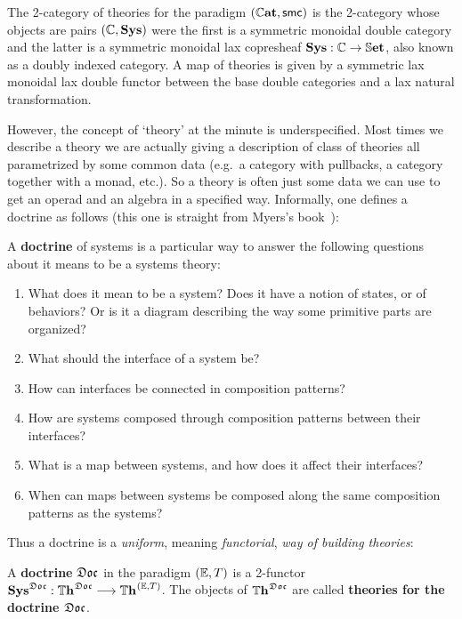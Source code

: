 \begin{example}
	The 2-category of theories for the paradigm $(\dblCat, \SymDblOperads)$ is the 2-category whose objects are pairs $(\compth{C}, \Sys)$ were the first is a symmetric monoidal double category and the latter is a symmetric monoidal lax copresheaf $\Sys:\compth{C} \to \dblSet$, also known as a doubly indexed category.
	A map of theories is given by a symmetric lax monoidal lax double functor between the base double categories and a lax natural transformation.
\end{example}

However, the concept of `theory' at the minute is underspecified.
Most times we describe a theory we are actually giving a description of class of theories all parametrized by some common data (e.g.~a category with pullbacks, a category together with a monad, etc.).
So a theory is often just some data we can use to get an operad and an algebra in a specified way.
Informally, one defines a doctrine as follows (this one is straight from Myers's book~\cite{myers_categorical_2022}):

\begin{informaldefinition}[Doctrine]
	A \textbf{doctrine} of systems is a particular way to answer the following questions about it means to be a systems theory:
	\begin{enumerate}
		\item What does it mean to be a system? Does it have a notion of states, or of behaviors?
		Or is it a diagram describing the way some primitive parts are organized?
		\item What should the interface of a system be?
		\item How can interfaces be connected in composition patterns?
		\item How are systems composed through composition patterns between their interfaces?
		\item What is a map between systems, and how does it affect their interfaces?
		\item When can maps between systems be composed along the same composition patterns as the systems?
	\end{enumerate}
\end{informaldefinition}

Thus a doctrine is a \emph{uniform}, meaning \emph{functorial}, \emph{way of building theories}:

\begin{definition}[Doctrine]
	A \textbf{doctrine} ${\mathfrak{Doc}}$ in the paradigm $\Paradigm$ is a 2-functor
	$\Sys^{\Doc} : \Theories^{\Doc} \longto \Theories^\Paradigm$.
	The objects of $\Theories^{\Doc}$ are called \textbf{theories for the doctrine ${\mathfrak{Doc}}$}.
\end{definition}

